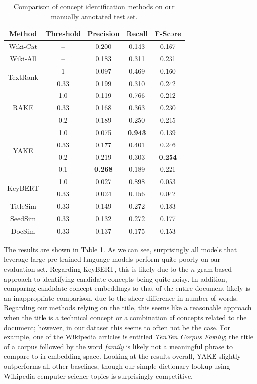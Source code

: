 \documentclass[thesis.tex]{subfiles}
\begin{document}
\begin{table}
\begin{center}
\small
\begin{tabular}{|c|c|c|c|c|} \hline
\textbf{Method} & \textbf{Threshold} & \textbf{Precision} & \textbf{Recall} & \textbf{F-Score} \\ \hline
Wiki-Cat & -- & 0.200 & 0.143 & 0.167 \\
Wiki-All & -- & 0.183 & 0.311 & 0.231 \\ \hline
\multirow{2}{1.5cm}{\centering TextRank} & 1 & 0.097 & 0.469 & 0.160 \\
& 0.33 & 0.199 & 0.310 & 0.242 \\ \hline
\multirow{3}{1.5cm}{\centering RAKE} & 1.0 & 0.119 & 0.766 & 0.212 \\ 
& 0.33 & 0.168 & 0.363 & 0.230 \\ 
& 0.2 & 0.189 & 0.250 & 0.215 \\ \hline
\multirow{4}{1.5cm}{\centering YAKE} & 1.0 & 0.075 & \textbf{0.943} & 0.139 \\
& 0.33 & 0.177 & 0.401 & 0.246 \\
& 0.2 & 0.219 & 0.303 & \textbf{0.254} \\
& 0.1 & \textbf{0.268} & 0.189 & 0.221 \\ \hline
\multirow{2}{1.5cm}{\centering KeyBERT} & 1.0 & 0.027 & 0.898 & 0.053 \\
& 0.33 & 0.024 & 0.156 & 0.042 \\ \hline
TitleSim & 0.33 & 0.149 & 0.272 & 0.183 \\
SeedSim & 0.33 & 0.132 & 0.272 & 0.177 \\
DocSim & 0.33 & 0.137 & 0.175 & 0.153 \\ \hline
\end{tabular}
\end{center}
\caption{\label{tab:concept_evaluation} Comparison of concept identification methods on our manually annotated test set.}
\end{table}

The results are shown in Table \ref{tab:concept_evaluation}. As we can see, surprisingly all models that leverage large pre-trained language models perform quite poorly on our evaluation set. Regarding KeyBERT, this is likely due to the $n$-gram-based approach to identifying candidate concepts being quite noisy. In addition, comparing candidate concept embeddings to that of the entire document likely is an inappropriate comparison, due to the sheer difference in number of words. Regarding our methods relying on the title, this seems like a reasonable approach when the title is a technical concept or a combination of concepts related to the document; however, in our dataset this seems to often not be the case. For example, one of the Wikipedia articles is entitled \textit{TenTen Corpus Family}; the title of a corpus followed by the word \textit{family} is likely not a meaningful phrase to compare to in embedding space. Looking at the results overall, YAKE slightly outperforms all other baselines, though our simple dictionary lookup using Wikipedia computer science topics is surprisingly competitive.
\end{document}
